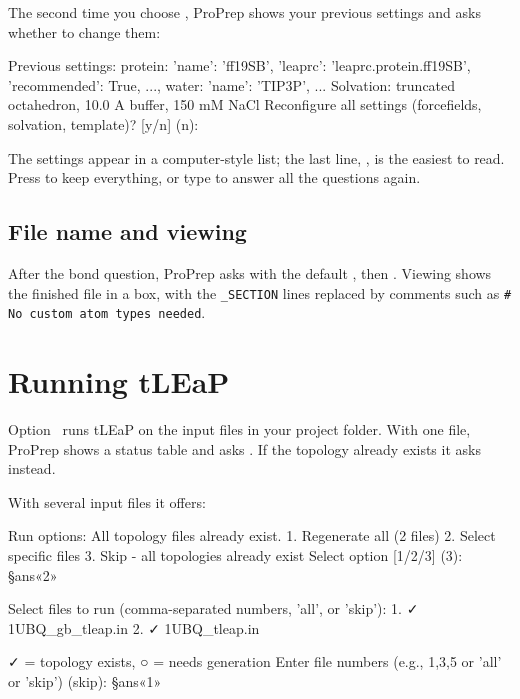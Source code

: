 The second time you choose , ProPrep shows your previous settings and
asks whether to change them:

\begin{screen}
Previous settings: protein: {'name': 'ff19SB', 'leaprc': 'leaprc.protein.ff19SB',
'recommended': True, ...}, water: {'name': 'TIP3P', ...}
Solvation: truncated octahedron, 10.0 A buffer, 150 mM NaCl
Reconfigure all settings (forcefields, solvation, template)? [y/n] (n):
\end{screen}

The settings appear in a computer-style list; the last line,
, is the easiest to read. Press  to keep
everything, or type  to answer all the questions again.

\subsection{File name and viewing}

After the bond question, ProPrep asks  with the default , then . Viewing shows the finished file in a box, with
the \texttt{\_SECTION} lines replaced by comments such as \texttt{\# No custom
atom types needed}.

\section{Running tLEaP}\label{sec:topology-run}

Option~ runs tLEaP on the input files in your project folder. With one
file, ProPrep shows a status table and asks . If the topology already
exists it asks 
instead.

With several input files it offers:

\begin{screen}
Run options:
All topology files already exist.
  1. Regenerate all (2 files)
  2. Select specific files
  3. Skip - all topologies already exist
Select option [1/2/3] (3): §ans«2»

Select files to run (comma-separated numbers, 'all', or 'skip'):
   1. ✓ 1UBQ_gb_tleap.in
   2. ✓ 1UBQ_tleap.in

✓ = topology exists, ○ = needs generation
Enter file numbers (e.g., 1,3,5 or 'all' or 'skip') (skip): §ans«1»
\end{screen}

